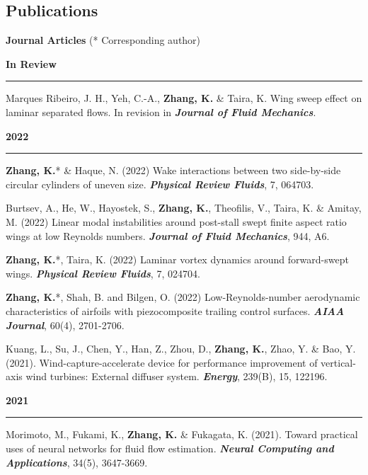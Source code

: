 \documentclass[10pt]{article}
\begin{document}
\subsection*{Publications}
{\bf \color{Blue}Journal Articles} (*  Corresponding author)
{\small
\begin{etaremune}
 \item [] {\bf \color{Blue} In Review \rule{13.8cm}{0.2mm}} 
 \item Marques Ribeiro, J. H., Yeh, C.-A., \textbf{Zhang, K.} \& Taira, K. Wing sweep effect on laminar separated flows. In revision in \textit{\textbf{Journal of Fluid Mechanics}}.
 
 \item [] {\bf \color{Blue} 2022 \rule{14.8cm}{0.2mm}}

 \item \textbf{Zhang, K.}* \& Haque, N. (2022) Wake interactions between two side-by-side circular cylinders of uneven size.  \textit{\textbf{Physical Review Fluids}}, 7, 064703.

  \item Burtsev, A., He, W., Hayostek, S., \textbf{Zhang, K.}, Theofilis, V., Taira, K. \& Amitay, M. (2022) Linear modal instabilities around post-stall swept finite aspect ratio wings at low Reynolds numbers. \textit{\textbf{Journal of Fluid Mechanics}}, 944, A6.

  \item \textbf{Zhang, K.}*, Taira, K. (2022) Laminar vortex dynamics around forward-swept wings.  \textit{\textbf{Physical Review Fluids}}, 7, 024704.

  \item \textbf{Zhang, K.}*, Shah, B. and Bilgen, O. (2022) Low-Reynolds-number aerodynamic characteristics of airfoils with piezocomposite trailing control surfaces. \textit{\textbf{AIAA Journal}}, 60(4), 2701-2706.

	\item Kuang, L., Su, J., Chen, Y., Han, Z., Zhou, D., \textbf{Zhang, K.}, Zhao, Y. \& Bao, Y. (2021). Wind-capture-accelerate device for performance improvement of vertical-axis wind turbines: External diffuser system. \textit{\textbf{Energy}}, 239(B), 15, 122196. 

\item [] {\bf \color{Blue} 2021 \rule{14.8cm}{0.2mm}}

  \item Morimoto, M., Fukami, K., \textbf{Zhang, K.} \& Fukagata, K. (2021). Toward practical uses of neural networks for fluid flow estimation. \textit{\textbf{Neural Computing and Applications}}, 34(5), 3647-3669.


\end{etaremune}}
\end{document}

